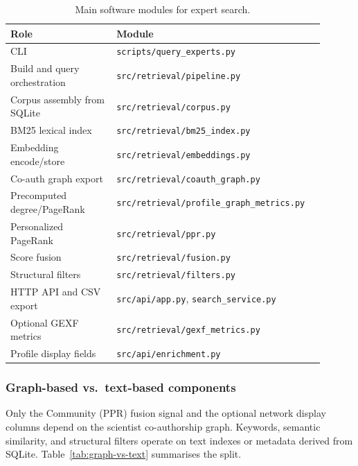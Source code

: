 \documentclass{article}
\begin{document}
\begin{table}[htbp]
  \centering
  \caption{Main software modules for expert search.}
  \label{tab:modules}
  \small
  \begin{tabular}{@{}p{0.32\linewidth}p{0.58\linewidth}@{}}
    \toprule
    Role & Module \\
    \midrule
    CLI & \texttt{scripts/query\_experts.py} \\
    Build and query orchestration & \texttt{src/retrieval/pipeline.py} \\
    Corpus assembly from SQLite & \texttt{src/retrieval/corpus.py} \\
    BM25 lexical index & \texttt{src/retrieval/bm25\_index.py} \\
    Embedding encode/store & \texttt{src/retrieval/embeddings.py} \\
    Co-auth graph export & \texttt{src/retrieval/coauth\_graph.py} \\
    Precomputed degree/PageRank & \texttt{src/retrieval/profile\_graph\_metrics.py} \\
    Personalized PageRank & \texttt{src/retrieval/ppr.py} \\
    Score fusion & \texttt{src/retrieval/fusion.py} \\
    Structural filters & \texttt{src/retrieval/filters.py} \\
    HTTP API and CSV export & \texttt{src/api/app.py}, \texttt{search\_service.py} \\
    Optional GEXF metrics & \texttt{src/retrieval/gexf\_metrics.py} \\
    Profile display fields & \texttt{src/api/enrichment.py} \\
    \bottomrule
  \end{tabular}
\end{table}

\subsubsection{Graph-based vs.\ text-based components}

Only the Community (PPR) fusion signal and the optional network display columns depend on the scientist co-authorship graph. Keywords, semantic similarity, and structural filters operate on text indexes or metadata derived from SQLite. Table~\ref{tab:graph-vs-text} summarises the split.
\end{document}
